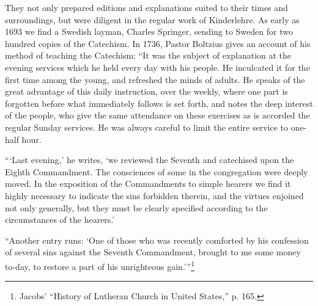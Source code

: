 They not only prepared editions and explanations suited to their times and surroundings, but were diligent in the regular work of Kinderlehre. As early as 1693 we find a Swedish layman, Charles Springer, sending to Sweden for two hundred copies of the Catechism. In 1736, Pastor Boltzius gives an account of his method of teaching the Catechism: “It was the subject of explanation
at the evening services which he held every day with his people. He inculcated it for the first time among the young, and refreshed the minds of adults. He speaks of the great advantage of this daily instruction, over the weekly, where one part is forgotten before what immediately follows is set forth, and notes the deep interest of the people, who give the same attendance on these exercises as is accorded the regular Sunday services. He was always careful to limit the entire service to one-half hour.

“‘Last evening,’ he writes, ‘we reviewed the Seventh and catechised upon the Eighth Commandment. The consciences of some in the congregation were deeply moved. In the exposition of the Commandments to simple hearers we find it highly necessary to indicate the sins forbidden therein, and the virtues enjoined not only generally, but they must be clearly specified according to the circumstances of the hearers.’

“Another entry runs: ‘One of those who was recently comforted by his confession of several sins against the Seventh Commandment, brought to me some money to-day, to restore a part of his unrighteous gain.’”\footnote{Jacobs’ “History of Lutheran Church in United States,” p. 165.}

